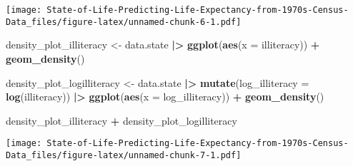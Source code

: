 \documentclass[
]{article}
\newenvironment{Shaded}{\begin{snugshade}}{\end{snugshade}}
\newcommand{\AttributeTok}[1]{\textcolor[rgb]{0.13,0.29,0.53}{#1}}
\newcommand{\FunctionTok}[1]{\textcolor[rgb]{0.13,0.29,0.53}{\textbf{#1}}}
\newcommand{\NormalTok}[1]{#1}
\newcommand{\OtherTok}[1]{\textcolor[rgb]{0.56,0.35,0.01}{#1}}
\newcommand{\SpecialCharTok}[1]{\textcolor[rgb]{0.81,0.36,0.00}{\textbf{#1}}}
\begin{document}
\texttt{[image: State-of-Life-Predicting-Life-Expectancy-from-1970s-Census-Data\_files/figure-latex/unnamed-chunk-6-1.pdf]}

\begin{Shaded}
\begin{Highlighting}[]
\NormalTok{density\_plot\_illiteracy }\OtherTok{\textless{}{-}}\NormalTok{ data.state }\SpecialCharTok{|\textgreater{}}
  \FunctionTok{ggplot}\NormalTok{(}\FunctionTok{aes}\NormalTok{(}\AttributeTok{x =}\NormalTok{ illiteracy)) }\SpecialCharTok{+}
  \FunctionTok{geom\_density}\NormalTok{()}

\NormalTok{density\_plot\_logilliteracy }\OtherTok{\textless{}{-}}\NormalTok{ data.state }\SpecialCharTok{|\textgreater{}}
  \FunctionTok{mutate}\NormalTok{(}\AttributeTok{log\_illiteracy =} \FunctionTok{log}\NormalTok{(illiteracy)) }\SpecialCharTok{|\textgreater{}}
  \FunctionTok{ggplot}\NormalTok{(}\FunctionTok{aes}\NormalTok{(}\AttributeTok{x =}\NormalTok{ log\_illiteracy)) }\SpecialCharTok{+} \FunctionTok{geom\_density}\NormalTok{()}

\NormalTok{density\_plot\_illiteracy }\SpecialCharTok{+}\NormalTok{ density\_plot\_logilliteracy}
\end{Highlighting}
\end{Shaded}

\texttt{[image: State-of-Life-Predicting-Life-Expectancy-from-1970s-Census-Data\_files/figure-latex/unnamed-chunk-7-1.pdf]}
\end{document}
